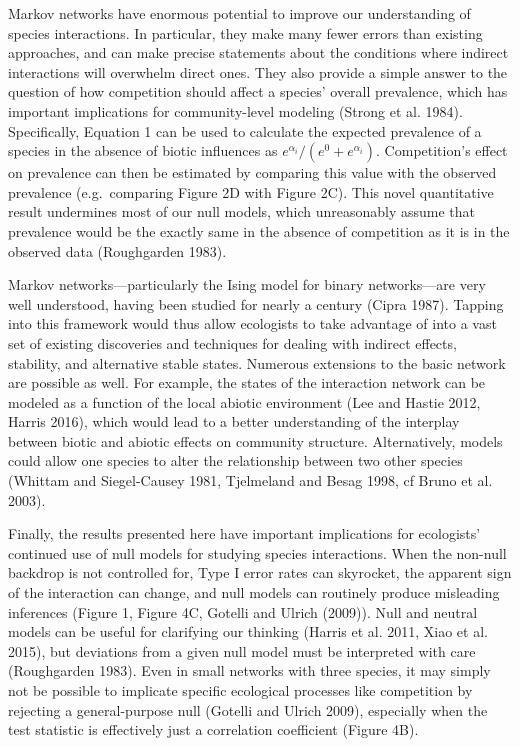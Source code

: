 \documentclass[12pt,]{article}
\begin{document}
\begin{spacing}{1.9}
\begin{flushleft}
Markov networks have enormous potential to improve our understanding of
species interactions. In particular, they make many fewer errors than
existing approaches, and can make precise statements about the
conditions where indirect interactions will overwhelm direct ones. They
also provide a simple answer to the question of how competition should
affect a species' overall prevalence, which has important implications
for community-level modeling (Strong et al. 1984). Specifically,
Equation 1 can be used to calculate the expected prevalence of a species
in the absence of biotic influences as
\(e^{\alpha_i}/(e^{0} + e^{\alpha_i})\). Competition's effect on
prevalence can then be estimated by comparing this value with the
observed prevalence (e.g.~comparing Figure 2D with Figure 2C). This
novel quantitative result undermines most of our null models, which
unreasonably assume that prevalence would be the exactly same in the
absence of competition as it is in the observed data (Roughgarden 1983).

Markov networks---particularly the Ising model for binary networks---are
very well understood, having been studied for nearly a century (Cipra
1987). Tapping into this framework would thus allow ecologists to take
advantage of into a vast set of existing discoveries and techniques for
dealing with indirect effects, stability, and alternative stable states.
Numerous extensions to the basic network are possible as well. For
example, the states of the interaction network can be modeled as a
function of the local abiotic environment (Lee and Hastie 2012, Harris
2016), which would lead to a better understanding of the interplay
between biotic and abiotic effects on community structure.
Alternatively, models could allow one species to alter the relationship
between two other species (Whittam and Siegel-Causey 1981, Tjelmeland
and Besag 1998, cf Bruno et al. 2003).

Finally, the results presented here have important implications for
ecologists' continued use of null models for studying species
interactions. When the non-null backdrop is not controlled for, Type I
error rates can skyrocket, the apparent sign of the interaction can
change, and null models can routinely produce misleading inferences
(Figure 1, Figure 4C, Gotelli and Ulrich (2009)). Null and neutral
models can be useful for clarifying our thinking (Harris et al. 2011,
Xiao et al. 2015), but deviations from a given null model must be
interpreted with care (Roughgarden 1983). Even in small networks with
three species, it may simply not be possible to implicate specific
ecological processes like competition by rejecting a general-purpose
null (Gotelli and Ulrich 2009), especially when the test statistic is
effectively just a correlation coefficient (Figure 4B).


\end{flushleft}
\end{spacing}
\end{document}
